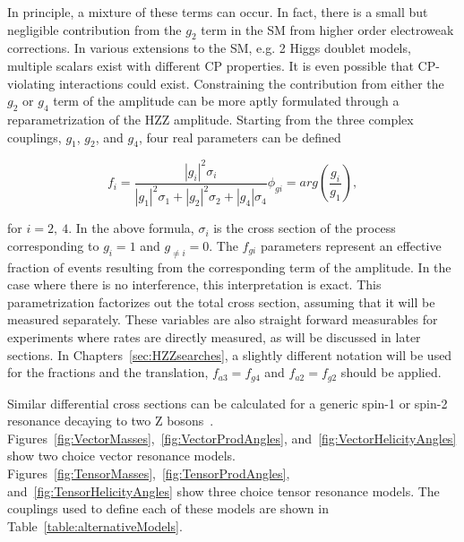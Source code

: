 In principle,
a mixture of these terms can occur.  In fact, there is a small but 
negligible contribution from the $g_2$ term in the SM from 
higher order electroweak corrections.  In various extensions to the SM, e.g. 
2 Higgs doublet models, multiple scalars exist with different CP 
properties.  It is even possible that CP-violating interactions 
could exist.  
Constraining the contribution
from either the $g_2$ or $g_4$ term of the amplitude can be more 
aptly 
formulated through a reparametrization of the HZZ amplitude.  
Starting from the three complex couplings, $g_1$, $g_2$, and $g_4$,
four real parameters can be defined
\begin{center}
\begin{subequations}
  \begin{equation}
    f_i = \frac{|g_i|^2\sigma_i }{|g_1|^2\sigma_1+|g_2|^2\sigma_2+|g_4|\sigma_4}
    \end{equation}
  \begin{equation}
    \phi_{gi} = arg(\frac{g_i}{g_1}),
    \end{equation}
\label{eq:HZZmodelParams}
\end{subequations}
\end{center}
for $i=2,~4$. 
In the above formula, $\sigma_i$ is the cross section of the 
process corresponding to $g_i=1$ and $g_{\neq i}=0$.  The $f_{gi}$
parameters represent an effective fraction of events
resulting from the corresponding term of the amplitude.  In the 
case where there is no interference, this interpretation is exact.
This parametrization factorizes out the total cross section,
assuming that it will be measured separately. These variables are 
also straight forward measurables for experiments where rates are 
directly measured, as will be discussed in later sections.  In 
Chapters~\ref{sec:HZZsearches}, a slightly different notation will
be used for the fractions and the translation, $f_{a3}=f_{g4}$ and 
$f_{a2}=f_{g2}$ should be applied.

Similar differential cross sections can be calculated for a generic spin-1 or spin-2 
resonance decaying to two Z bosons~\cite{Bolognesi:2012mm}.  
Figures~\ref{fig:VectorMasses},~\ref{fig:VectorProdAngles}, 
and~\ref{fig:VectorHelicityAngles} show two choice vector 
resonance models.  
Figures~\ref{fig:TensorMasses},~\ref{fig:TensorProdAngles}, 
and~\ref{fig:TensorHelicityAngles}
show three choice tensor 
resonance models.  The couplings used to define each of these 
models are shown in Table~\ref{table:alternativeModels}.  

